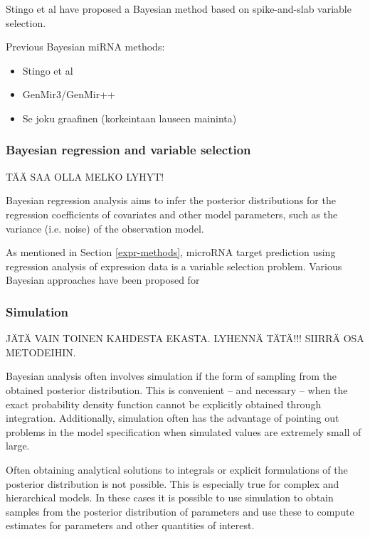 Stingo et al have proposed a Bayesian method based on spike-and-slab variable
selection.

Previous Bayesian miRNA methods:
\begin{itemize}
  \item Stingo et al
  \item GenMir3/GenMir++
  \item Se joku graafinen (korkeintaan lauseen maininta)
\end{itemize}


\subsubsection{Bayesian regression and variable selection}

TÄÄ SAA OLLA MELKO LYHYT!

Bayesian regression analysis aims to infer the posterior distributions
for the regression coefficients of covariates and other model parameters,
such as the variance (i.e. noise) of the observation model.

As mentioned in Section \ref{expr-methods}, microRNA target prediction
using regression analysis of expression data is  a variable
selection problem. Various Bayesian approaches have been proposed
for 



\subsubsection{Simulation}\label{simulation}

JÄTÄ VAIN TOINEN KAHDESTA EKASTA. LYHENNÄ TÄTÄ!!! SIIRRÄ OSA METODEIHIN.

Bayesian analysis often involves simulation if the form of sampling from the
obtained posterior distribution. This is convenient -- and necessary -- when
the exact probability density function cannot be explicitly obtained through
integration. Additionally, simulation often has the advantage of pointing out
problems in the model specification when simulated values are extremely small
of large.

Often obtaining analytical solutions to integrals or explicit formulations of
the posterior distribution is not possible. This is especially true for
complex and hierarchical models. In these cases it is possible to use
simulation to obtain samples from the posterior distribution of parameters and
use these to compute estimates for parameters and other quantities of
interest.

